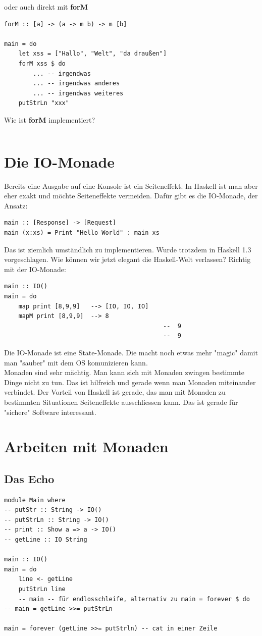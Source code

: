 \documentclass[ngerman,a4paper]{report}
\begin{document}
oder auch direkt mit \textbf{forM}

\begin{lstlisting}
forM :: [a] -> (a -> m b) -> m [b]

main = do
	let xss = ["Hallo", "Welt", "da draußen"]
	forM xss $ do
		...	-- irgendwas
		...	-- irgendwas anderes
		...	-- irgendwas weiteres
	putStrLn "xxx"
\end{lstlisting}

Wie ist \textbf{forM} implementiert?

\begin{lstlisting}

\end{lstlisting}

\section{Die IO-Monade}
Bereits eine Ausgabe auf eine Konsole ist ein Seiteneffekt. In Haskell ist man aber eher exakt und möchte Seiteneffekte vermeiden. Dafür gibt es die IO-Monade, der Ansatz:
\begin{lstlisting}
main :: [Response] -> [Request]
main (x:xs) = Print "Hello World" : main xs
\end{lstlisting}
Das ist ziemlich umständlich zu implementieren. Wurde trotzdem in Haskell 1.3 vorgeschlagen. Wie können wir jetzt elegant die Haskell-Welt verlassen? Richtig mit der IO-Monade:
\begin{lstlisting}
main :: IO()
main = do
	map print [8,9,9] 	--> [IO, IO, IO]
	mapM print [8,9,9] 	-->	8
											--	9
											--	9
\end{lstlisting}
Die IO-Monade ist eine State-Monade. Die macht noch etwas mehr "magic" damit man "sauber" mit dem OS komunizieren kann.\\
Monaden sind sehr mächtig. Man kann sich mit Monaden zwingen bestimmte Dinge nicht zu tun. Das ist hilfreich und gerade wenn man Monaden miteinander verbindet. Der Vorteil von Haskell ist gerade, das man mit Monaden zu bestimmten Situationen Seiteneffekte ausschliessen kann. Das ist gerade für "sichere" Software interessant.\\

\section{Arbeiten mit Monaden}
\subsection{Das Echo}
\begin{lstlisting}
module Main where
-- putStr :: String -> IO()
-- putStrLn :: String -> IO()
-- print :: Show a => a -> IO()
-- getLine :: IO String

main :: IO()
main = do
	line <- getLine
	putStrLn line
	-- main -- für endlosschleife, alternativ zu main = forever $ do
-- main = getLine >>= putStrLn

main = forever (getLine >>= putStrln) -- cat in einer Zeile
\end{lstlisting}
\end{document}
